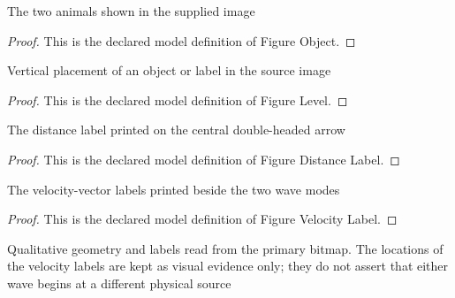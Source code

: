 \begin{definition}
  \label{def:physics:phyx-mini-0286:phyxminiproblems-problemphyxmini0286-figureobject}
  The two animals shown in the supplied image
\end{definition}
\begin{proof}
  This is the declared model definition of Figure Object.
\end{proof}
\begin{definition}
  \label{def:physics:phyx-mini-0286:phyxminiproblems-problemphyxmini0286-figurelevel}
  Vertical placement of an object or label in the source image
\end{definition}
\begin{proof}
  This is the declared model definition of Figure Level.
\end{proof}
\begin{definition}
  \label{def:physics:phyx-mini-0286:phyxminiproblems-problemphyxmini0286-figuredistancelabel}
  The distance label printed on the central double-headed arrow
\end{definition}
\begin{proof}
  This is the declared model definition of Figure Distance Label.
\end{proof}
\begin{definition}
  \label{def:physics:phyx-mini-0286:phyxminiproblems-problemphyxmini0286-figurevelocitylabel}
  The velocity-vector labels printed beside the two wave modes
\end{definition}
\begin{proof}
  This is the declared model definition of Figure Velocity Label.
\end{proof}
\begin{definition}
  \label{def:physics:phyx-mini-0286:phyxminiproblems-problemphyxmini0286-sandscorpionfigure}
  Qualitative geometry and labels read from the primary bitmap. The locations of the velocity labels are kept as visual evidence only; they do not assert that either wave begins at a different physical source
\end{definition}

